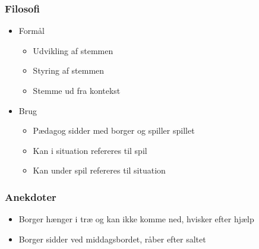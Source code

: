 \begin{frame}
\frametitle{Filosofi}

\begin{itemize}
\item Formål
\begin{itemize}
\item Udvikling af stemmen
\item Styring af stemmen
\item Stemme ud fra kontekst
\end{itemize}
\item Brug
\begin{itemize}
\item Pædagog sidder med borger og spiller spillet
\item Kan i situation refereres til spil
\item Kan under spil refereres til situation
\end{itemize}
\end{itemize}

\end{frame}

\begin{frame}
\frametitle{Anekdoter}

\begin{itemize}
\item Borger hænger i træ og kan ikke komme ned, hvisker efter hjælp
\item Borger sidder ved middagsbordet, råber efter saltet
\end{itemize}

\end{frame}

